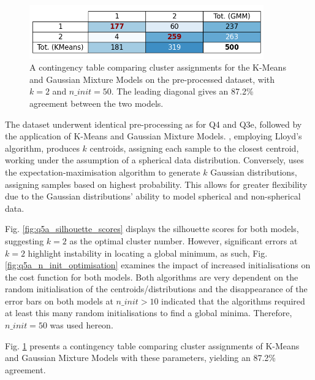     \begin{figure}[htb]
    \centering
    \includegraphics[width=0.9\textwidth]{./figures/q5a_contingency_table}
    \caption{A contingency table comparing cluster assignments for the K-Means and Gaussian Mixture Models on the
        pre-processed  dataset, with $k=2$ and $n\_init=50$. The leading diagonal
        gives an 87.2\% agreement between the two models.}
    \label{fig:q5a_contingency_table}
    \end{figure}

    The dataset  underwent identical pre-processing as for Q4 and Q3e, followed by
    the application of K-Means and Gaussian Mixture Models.
    , employing Lloyd's algorithm, produces $k$ centroids, assigning each sample to the closest centroid,
    working under the assumption of a spherical data distribution.
    Conversely,  uses the expectation-maximisation algorithm to generate $k$ Gaussian
    distributions, assigning samples based on highest probability.
    This allows for greater flexibility due to the Gaussian distributions' ability to model spherical and non-spherical
    data.

    Fig. \ref{fig:q5a_silhouette_scores} displays the silhouette scores for both models, suggesting $k=2$ as the optimal
    cluster number.
    However, significant errors at $k=2$ highlight instability in locating a global minimum, as such, Fig. \ref{fig:q5a_n_init_optimisation}
    examines the impact of increased initialisations on the cost function for both models.
    Both algorithms are very dependent on the random initialisation of the centroids/distributions and the disappearance
    of the error bars on both models at $n\_init > 10$ indicated that the algorithms required at least this many random
    initialisations to find a global minima.
    Therefore, $n\_init=50$ was used hereon.

    Fig. \ref{fig:q5a_contingency_table} presents a contingency table comparing cluster assignments of K-Means and
    Gaussian Mixture Models with these parameters, yielding an 87.2\% agreement.

